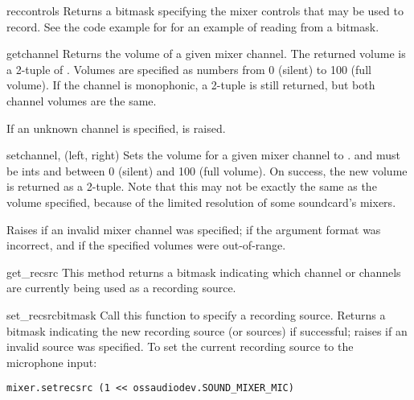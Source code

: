 \begin{methoddesc}{reccontrols}{}
Returns a bitmask specifying the mixer controls that may be used to record.
See the code example for  for an example of reading from
a bitmask.
\end{methoddesc}

\begin{methoddesc}{get}{channel}
Returns the volume of a given mixer channel. The returned volume is a
2-tuple of . Volumes are specified as
numbers from 0 (silent) to 100 (full volume). If the channel is monophonic,
a 2-tuple is still returned, but both channel volumes are the same.

If an unknown channel is specified,  is raised.
\end{methoddesc}

\begin{methoddesc}{set}{channel, (left, right)}
Sets the volume for a given mixer channel to .
 and  must be ints and between 0 (silent) and 100
(full volume). On success, the new volume is returned as a 2-tuple. Note
that this may not be exactly the same as the volume specified, because of
the limited resolution of some soundcard's mixers. 

Raises  if an invalid mixer channel was specified;
 if the argument format was incorrect, and 
 if the specified volumes were out-of-range.
\end{methoddesc}

\begin{methoddesc}{get_recsrc}{}
This method returns a bitmask indicating which channel or channels are
currently being used as a recording source.
\end{methoddesc}

\begin{methoddesc}{set_recsrc}{bitmask}
Call this function to specify a recording source. Returns a bitmask
indicating the new recording source (or sources) if successful; raises
 if an invalid source was specified. To set the current
recording source to the microphone input:

\begin{verbatim}
mixer.setrecsrc (1 << ossaudiodev.SOUND_MIXER_MIC)
\end{verbatim}
\end{methoddesc}



